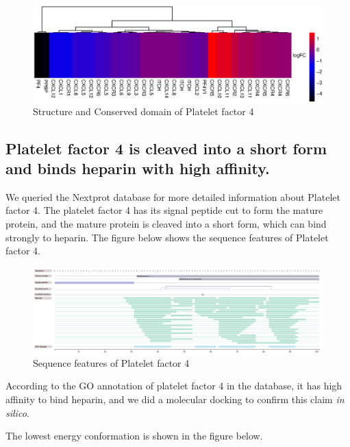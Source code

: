 \begin{figure}[H]
    \centering
    \includegraphics[width=1\textwidth]{image/CXCHM.eps}
    \caption{Structure and Conserved domain of Platelet factor 4}
    \label{HMCD3}
\end{figure}

\subsection{Platelet factor 4 is cleaved into a short form and binds heparin with high affinity.}

We queried the Nextprot database for more detailed information about Platelet factor 4. The platelet factor 4 has its signal peptide cut to form the mature protein, and the mature protein is cleaved into a short form, which can bind strongly to heparin. The figure below shows the sequence features of Platelet factor 4.

\begin{figure}[H]
    \centering
    \includegraphics[width=1\textwidth]{image/PF4ISO.png}
    \caption{Sequence features of Platelet factor 4}
    \label{HMCD3}
\end{figure}

According to the GO annotation of platelet factor 4 in the database, it has high affinity to bind heparin, and we did a molecular docking to confirm this claim \textit{in silico}. 

The lowest energy conformation is shown in the figure below.

